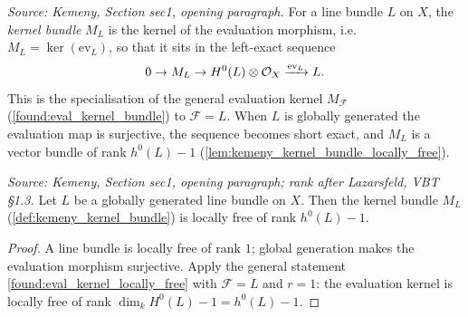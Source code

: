 \begin{definition}
  \label{def:kemeny_kernel_bundle}
  \textit{Source: Kemeny, Section sec1, opening paragraph.}
  For a line bundle \(L\) on \(X\), the \emph{kernel bundle} \(M_L\) is the kernel
  of the evaluation morphism, i.e.\ \(M_L=\ker(\mathrm{ev}_L)\), so that it sits in
  the left-exact sequence
  \[
    0\to M_L\to H^0(L)\otimes\mathcal{O}_X\xrightarrow{\mathrm{ev}_L}L .
  \]
  This is the specialisation of the general evaluation kernel \(M_{\mathcal F}\)
  (\cref{found:eval_kernel_bundle}) to \(\mathcal F=L\).  When \(L\) is globally
  generated the evaluation map is surjective, the sequence becomes short exact, and
  \(M_L\) is a vector bundle of rank \(h^0(L)-1\)
  (\cref{lem:kemeny_kernel_bundle_locally_free}).
\end{definition}

\begin{lemma}
  \label{lem:kemeny_kernel_bundle_locally_free}
  \textit{Source: Kemeny, Section sec1, opening paragraph; rank after Lazarsfeld, VBT \S1.3.}
  Let \(L\) be a globally generated line bundle on \(X\).  Then the kernel bundle
  \(M_L\) (\cref{def:kemeny_kernel_bundle}) is locally free of rank \(h^0(L)-1\).
\end{lemma}

\begin{proof}
  A line bundle is locally free of rank \(1\); global generation makes the
  evaluation morphism surjective.  Apply the general statement
  \cref{found:eval_kernel_locally_free} with \(\mathcal F=L\) and \(r=1\): the
  evaluation kernel is locally free of rank \(\dim_k H^0(L)-1=h^0(L)-1\).
\end{proof}

